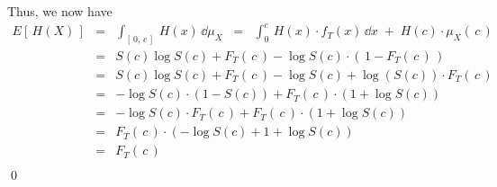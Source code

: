 Thus, we now have
\begin{eqnarray*}
E[\,H(X)\,]
&=&       \int_{[\,0,\,c\,]}\,H(x)\,\dd\mu_{X}
\;\;=\;\; \int_{0}^{c}\,H(x)\cdot f_{T}(x)\,\dd x \;+\; H(c)\cdot \mu_{X}(\,c\,) \\
&=&       S(c)\log S(c) + F_{T}(\,c\,) - \log S(c) \cdot \left(\,1 - F_{T}(\,c\,)\,\right) \\
&=&       S(c)\log S(c) + F_{T}(\,c\,) - \log S(c) + \log(S(c)) \cdot F_{T}(\,c\,) \\
&=&       - \log S(c) \cdot (1 - S(c)) + F_{T}(\,c\,) \cdot (1 + \log S(c)) \\ 
&=&       - \log S(c) \cdot F_{T}(\,c\,) + F_{T}(\,c\,) \cdot (1 + \log S(c)) \\ 
&=&       F_{T}(\,c\,) \cdot \left( - \log S(c) + 1 + \log S(c) \right) \\ 
&=&       F_{T}(\,c\,) \\
\end{eqnarray*}
\qed


